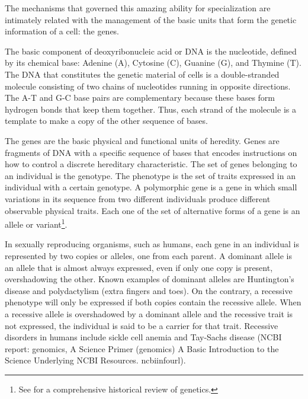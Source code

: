 The mechanisms that governed this amazing ability for specialization are intimately
related with the management of the basic units that form the genetic information of a cell:
the genes.



The basic component of deoxyribonucleic acid or DNA is the nucleotide, defined by its chemical 
base: Adenine (A), Cytosine (C), Guanine (G), and Thymine (T). 
%
The DNA that constitutes the genetic 
material of cells is a double-stranded molecule consisting of two chains of nucleotides running in 
opposite directions. 
%
The A-T and G-C base pairs are complementary because these bases form hydrogen 
bonds that keep them together. Thus, each strand of the molecule is a template to make a copy of the 
other sequence of bases.%

The genes are the basic physical and functional units of heredity. Genes 
%
are fragments of DNA 
with a specific sequence of bases that encodes instructions on how to control a discrete 
hereditary characteristic. The set of genes belonging to an individual is the genotype.%
The phenotype 
% 
is the set of traits expressed in an individual with a certain genotype. A polymorphic 
gene is a gene in which small variations in its sequence from two different individuals produce 
different observable physical traits. Each one of the set of alternative forms of a gene 
is an allele 
% 
or variant\footnote{See \citet{lander:2000a} for a comprehensive historical review of genetics.}.

In sexually reproducing organisms, such as humans, each gene in an individual is represented
by two copies or alleles, one from each parent. A dominant allele is an allele that is almost
always expressed, even if only one copy is present, overshadowing the other. Known examples
of dominant alleles are Huntington's disease and polydactylism (extra fingers and toes).
On the contrary, a recessive phenotype will only be expressed if both copies contain the recessive 
allele. When a recessive allele is overshadowed by a dominant allele and the recessive trait is not 
expressed, the individual is said to be a carrier for that trait. Recessive disorders in humans include
sickle cell anemia and Tay-Sachs disease
(NCBI report: genomics,
    { A Science Primer (genomics)}
    {%
      A Basic Introduction to the Science Underlying NCBI Resources.
    }%
    {ncbiinfourl}).

